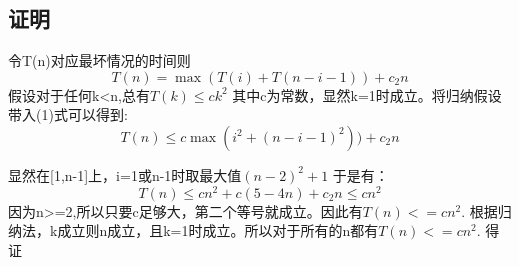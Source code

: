 \documentclass[UTF8]{ctexart}
\begin{document}

\subsection{证明}
令T(n)对应最坏情况的时间则
\begin{equation}
  T(n)={\max (T(i)+T(n-i-1))+c_{2} n}
\end{equation}
假设对于任何k<n,总有$T(k) \leq c{k}^{2}$ 其中c为常数，显然k=1时成立。将归纳假设带入(1)式可以得到:
\begin{equation}
  T(n)\leq{c\max ({i}^{2}+{(n-i-1)}^{2}))+c_{2} n}
\end{equation}

显然在[1,n-1]上，i=1或n-1时取最大值${(n-2)}^{2}+1$ 于是有：
\begin{equation}
  T(n)\leq{c{n}^{2}+c(5-4n)+c_{2}n}\leq c{n}^{2}
\end{equation}
因为n>=2,所以只要c足够大，第二个等号就成立。因此有$T(n)<=cn^{2}$. 根据归纳法，k成立则n成立，且k=1时成立。所以对于所有的n都有$T(n)<=cn^{2}$. 得证



\end{document}
